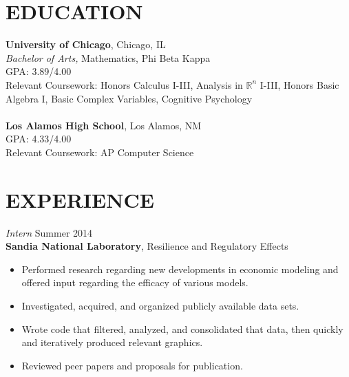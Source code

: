 \documentclass[margin, 10pt]{res} %
\begin{document}
\begin{resume}

% 
%


\section{EDUCATION}

\textbf{University of Chicago}, Chicago, IL \\
{\sl Bachelor of Arts,} Mathematics, Phi Beta Kappa \\
GPA: 3.89/4.00 \\
Relevant Coursework: Honors Calculus I-III, Analysis in $\mathbb{R}^n$ I-III, Honors Basic Algebra I, Basic Complex Variables, Cognitive Psychology \\\\
\textbf{Los Alamos High School}, Los Alamos, NM \\
GPA: 4.33/4.00 \\
Relevant Coursework: AP Computer Science
 
 
\section{EXPERIENCE}

{\sl Intern} \hfill Summer 2014 \\
\textbf{Sandia National Laboratory}, Resilience and Regulatory Effects

\begin{itemize} \itemsep -2pt %
\item Performed research regarding new developments in economic modeling and offered input regarding the efficacy of various models. 
\item Investigated, acquired, and organized publicly available data sets. 
\item Wrote code that filtered, analyzed, and consolidated that data, then quickly and iteratively produced relevant graphics. 
\item Reviewed peer papers and proposals for publication. 
\end{itemize}
 

\end{resume}
\end{document}

